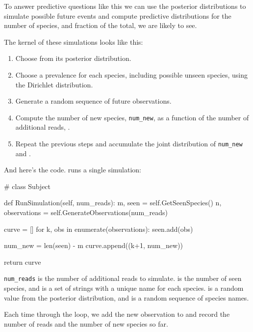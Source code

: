 \documentclass[12pt]{book}
\theoremstyle{exercise}
\begin{document}
To answer predictive questions like this we can use the posterior
distributions to simulate possible future events and compute
predictive distributions for the number of species, and fraction of
the total, we are likely to see.

The kernel of these simulations looks like this:

\begin{enumerate}

\item Choose  from its posterior distribution.

\item Choose a prevalence for each species, including possible unseen
  species, using the Dirichlet distribution.

\item Generate a random sequence of future observations.

\item Compute the number of new species, \verb"num_new", as a function
  of the number of additional reads, .

\item Repeat the previous steps and accumulate the joint distribution
  of \verb"num_new" and .

\end{enumerate}

And here's the code.   runs a single simulation:

\begin{code}
# class Subject

    def RunSimulation(self, num_reads):
        m, seen = self.GetSeenSpecies()
        n, observations = self.GenerateObservations(num_reads)

        curve = []
        for k, obs in enumerate(observations):
            seen.add(obs)

            num_new = len(seen) - m
            curve.append((k+1, num_new))

        return curve
\end{code}

\verb"num_reads" is the number of additional reads to simulate.
 is the number of seen species, and  is a set of
strings with a unique name for each species.
 is a random value from the posterior distribution, and
 is a random sequence of species names.

Each time through the loop, we add the new observation to
 and record the number of reads and the number of
new species so far.
\end{document}
